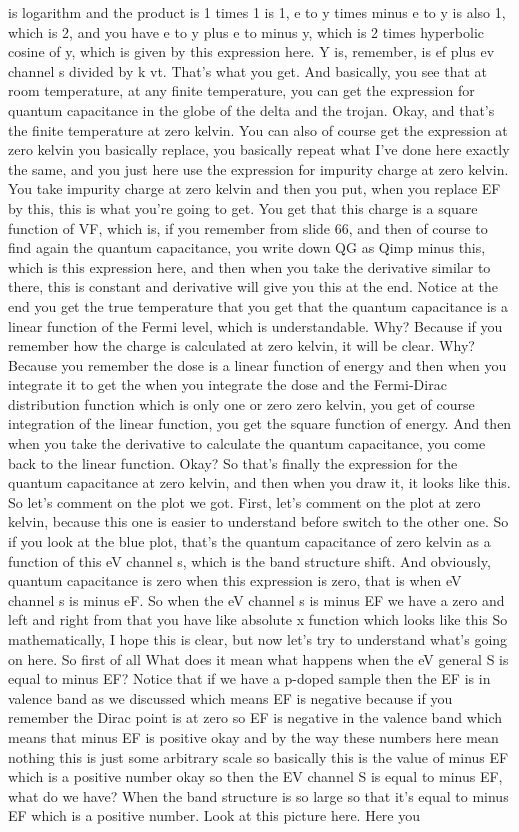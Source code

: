 is logarithm and the product is 1 times 1 is 1, e to y times minus e to y is also 1, which is 2, and you have e to y plus e to minus y, which is 2 times hyperbolic cosine of y, which is given by this expression here. Y is, remember, is ef plus ev channel s divided by k vt. That's what you get. And basically, you see that at room temperature, at any finite temperature, you can get the expression for quantum capacitance in the globe of the delta and the trojan. Okay, and that's the finite temperature at zero kelvin. You can also of course get the expression at zero kelvin you basically replace, you basically repeat what I've done here exactly the same, and you just here use the expression for impurity charge at zero kelvin. You take impurity charge at zero kelvin and then you put, when you replace EF by this, this is what you're going to get. You get that this charge is a square function of VF, which is, if you remember from slide 66, and then of course to find again the quantum capacitance, you write down QG as Qimp minus this, which is this expression here, and then when you take the derivative similar to there, this is constant and derivative will give you this at the end. Notice at the end you get the true temperature that you get that the quantum capacitance is a linear function of the Fermi level, which is understandable. Why? Because if you remember how the charge is calculated at zero kelvin, it will be clear. Why? Because you remember the dose is a linear function of energy and then when you integrate it to get the when you integrate the dose and the Fermi-Dirac distribution function which is only one or zero zero kelvin, you get of course integration of the linear function, you get the square function of energy. And then when you take the derivative to calculate the quantum capacitance, you come back to the linear function. Okay? So that's finally the expression for the quantum capacitance at zero kelvin, and then when you draw it, it looks like this. So let's comment on the plot we got. First, let's comment on the plot at zero kelvin, because this one is easier to understand before switch to the other one. So if you look at the blue plot, that's the quantum capacitance of zero kelvin as a function of this eV channel s, which is the band structure shift. And obviously, quantum capacitance is zero when this expression is zero, that is when eV channel s is minus eF. So when the eV channel s is minus EF we have a zero and left and right from that you have like absolute x function which looks like this So mathematically, I hope this is clear, but now let's try to understand what's going on here. So first of all What does it mean what happens when the eV general S is equal to minus EF? Notice that if we have a p-doped sample then the EF is in valence band as we discussed which means EF is negative because if you remember the Dirac point is at zero so EF is negative in the valence band which means that minus EF is positive okay and by the way these numbers here mean nothing this is just some arbitrary scale so basically this is the value of minus EF which is a positive number okay so then the EV channel S is equal to minus EF, what do we have? When the band structure is so large so that it's equal to minus EF which is a positive number. Look at this picture here. Here you 